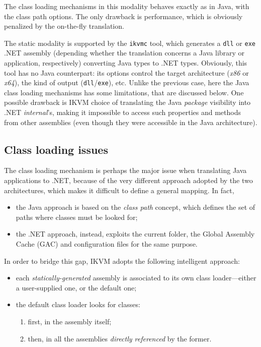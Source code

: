 The class loading mechanisms in this modality behaves exactly as in Java, with the class path options.
The only drawback is performance, which is obviously penalized by the on-the-fly translation.

The static modality is supported by the \texttt{ikvmc} tool, which generates a \texttt{dll} or \texttt{exe} .NET assembly (depending whether the translation concerns a Java library or application, respectively) converting Java types to .NET types.
Obviously, this tool has no Java counterpart: its options control the target architecture (\textit{x86} or \textit{x64}), the kind of output (\texttt{dll}/\texttt{exe}), etc.
Unlike the previous case, here the Java class loading mechanisms has some limitations, that are discussed below.
One possible drawback is IKVM choice of translating the Java \textit{package} visibility into .NET \textit{internal}'s, making it impossible to access such properties and methods from other assemblies (even though they were accessible in the Java architecture).

\subsection{Class loading issues}
\label{ssec:ikvm-class-loading}

The class loading mechanism is perhaps the major issue when translating Java applications to .NET, because of the very different approach adopted by the two architectures, which makes it difficult to define a general mapping. In fact,
\begin{itemize}
  \item the Java approach is based on the \textit{class path} concept, which defines the set of paths where classes must be looked for;
  \item the .NET approach, instead, exploits the current folder, the Global Assembly Cache (GAC) and configuration files for the same purpose.
\end{itemize}

\noindent In order to bridge this gap, IKVM adopts the following intelligent approach:
\begin{itemize}
  \item each \textit{statically-generated} assembly is associated to its own class loader---either a user-supplied one, or the default one;

  \item the default class loader looks for classes:
  \begin{enumerate}
    \item first, in the assembly itself;
    \item then, in all the assemblies \textit{directly referenced} by the former.
  \end{enumerate}
\end{itemize}

